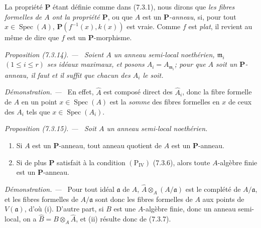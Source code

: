 \documentclass[10pt,oneside]{book}
\newcommand{\oldpage}[2][]{%
  \setcounter{footnote}{0}%
  \marginpar{\scriptsize\textbf{#1}~|~#2}\ignorespaces}
\newenvironment{proposition}[1][]{%
  \par\medskip\noindent\itshape Proposition (#1). ---\ }{\par}
\newenvironment{proof}{%
  \par\medskip\noindent\textit{Démonstration. ---\ }}{\par}
\begin{document}
\oldpage[IV-2]{196}

La propriété $\boldsymbol P$ étant définie comme dans (7.3.1), nous dirons
que \emph{les fibres formelles de $A$ ont la propriété $\boldsymbol P$},
ou que $A$ est un \emph{$\boldsymbol P$-anneau}, si, pour tout
$x\in\operatorname{Spec}(A)$,
$\boldsymbol P(f^{-1}(x),k(x))$ est vraie. Comme $f$ est \emph{plat}, il
revient au même de dire que $f$ est un $\boldsymbol P$-morphisme.

\begin{proposition}[7.3.14]
\label{IV.2.s7.3.14-fr}
Soient $A$ un anneau semi-local noethérien,
$\mathfrak m_i$ $(1\leqslant i\leqslant r)$ ses idéaux maximaux, et posons
$A_i=A_{\mathfrak m_i}$; pour que $A$ soit un $\boldsymbol P$-anneau, il
faut et il suffit que chacun des $A_i$ le soit.
\end{proposition}

\begin{proof}
En effet, $\widehat A$ est composé direct des $\widehat A_i$, donc la
fibre formelle de $A$ en un point $x\in\operatorname{Spec}(A)$ est la
\emph{somme} des fibres formelles en $x$ de ceux des $A_i$ tels que
$x\in\operatorname{Spec}(A_i)$.
\end{proof}

\begin{proposition}[7.3.15]
\label{IV.2.s7.3.15-fr}
Soit $A$ un anneau semi-local noethérien.
\begin{enumerate}
\item[\emph{i)}] Si $A$ est un $\boldsymbol P$-anneau, tout anneau quotient de $A$
est un $\boldsymbol P$-anneau.
\item[\emph{ii)}] Si de plus $\boldsymbol P$ satisfait à la condition
$(\mathrm P_{\mathrm{IV}})$ (7.3.6), alors toute $A$-algèbre finie est un
$\boldsymbol P$-anneau.
\end{enumerate}
\end{proposition}

\begin{proof}
Pour tout idéal $\mathfrak a$ de $A$,
$\widehat A\otimes_A(A/\mathfrak a)$ est le complété de
$A/\mathfrak a$, et les fibres formelles de $A/\mathfrak a$ sont donc les
fibres formelles de $A$ aux points de $V(\mathfrak a)$, d'où (i). D'autre
part, si $B$ est une $A$-algèbre finie, donc un anneau semi-local, on a
$\widehat B=B\otimes_A\widehat A$, et (ii) résulte donc de (7.3.7).
\end{proof}
\end{document}
